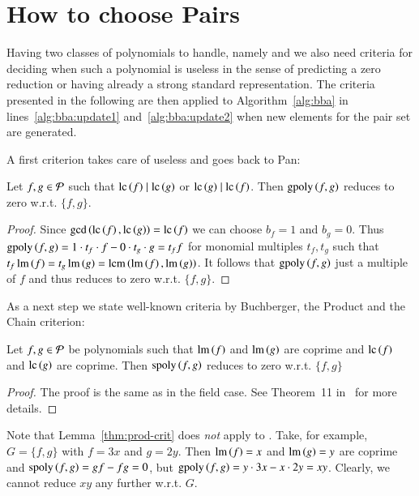 \section{How to choose Pairs}
\label{sec:pairs}
Having two classes of polynomials to handle, namely \spts and \gpts we also need
criteria for deciding when such a polynomial is useless in the sense of
predicting a zero reduction or having already a strong standard representation.
The criteria presented in the following are then applied to
Algorithm~\ref{alg:bba} in lines~\ref{alg:bba:update1} and~\ref{alg:bba:update2}
when new elements for the pair set are generated.

A first criterion takes care of useless \gpts and goes back to Pan:

\begin{lemma}
Let $f,g \in \mathcal{P}$ such that $\mathrm{lc}\left({f}\right) \mid \mathrm{lc}\left({g}\right)$ or $\mathrm{lc}\left({g}\right) \mid \mathrm{lc}\left({f}\right)$. Then $\mathrm{gpoly}\left({f},{g}\right)$ reduces
to zero w.r.t. $\{f,g\}$.
\label{crit:gpoly-easy}
\end{lemma}

\begin{proof}
Since $\gcd\left(\mathrm{lc}\left({f}\right), \mathrm{lc}\left({g}\right)\right) = \mathrm{lc}\left({f}\right)$ we can choose $b_f = 1$ and $b_g
=0$. Thus $\mathrm{gpoly}\left({f},{g}\right) = 1 \cdot t_f \cdot f - 0 \cdot t_g \cdot g = t_f f$ for monomial
multiples $t_f, t_g$ such that $t_f \operatorname{lm}\left({f}\right) = t_g \operatorname{lm}\left({g}\right) = \operatorname{lcm}\left(\operatorname{lm}\left({f}\right), \operatorname{lm}\left({g}\right)\right)$. It follows that $\mathrm{gpoly}\left({f},{g}\right)$ just a multiple of $f$ and
thus reduces to zero w.r.t. $\{f,g\}$.
\end{proof}

As a next step we state well-known criteria by Buchberger, the Product and the
Chain criterion:

\begin{lemma}
Let
$f,g \in \mathcal{P}$ be polynomials such that $\operatorname{lm}\left({f}\right)$ and $\operatorname{lm}\left({g}\right)$ are coprime and $\mathrm{lc}\left({f}\right)$ and $\mathrm{lc}\left({g}\right)$ are coprime.
Then $\mathrm{spoly}\left({f},{g}\right)$ reduces to zero w.r.t. $\{f,g\}$
\label{thm:prod-crit}
\end{lemma}

\begin{proof}
The proof is the same as in the field case.
See Theorem~11 in~\cite{lichtblau2012} for more details.
\end{proof}

Note that Lemma~\ref{thm:prod-crit} does \emph{not} apply to \gpts. Take, for
example, $G=\{f,g\}$ with $f=3x$ and $g=2y$. Then $\operatorname{lm}\left({f}\right) = x$ and $\operatorname{lm}\left({g}\right) = y$
are coprime and $\mathrm{spoly}\left({f},{g}\right) = g f - fg = 0$, but $\mathrm{gpoly}\left({f},{g}\right) = y \cdot 3x - x
\cdot 2y = xy$. Clearly, we cannot reduce $xy$ any further w.r.t. $G$.

